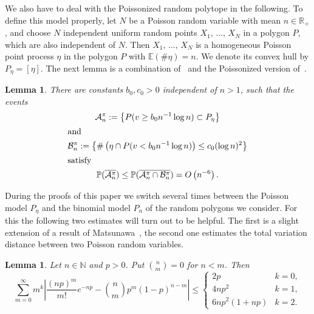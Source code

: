 \documentclass[10pt]{amsart}
\newtheorem{lemm}[theo]{Lemma}\newtheorem{prop}[theo]{Proposition}\newtheorem{coro}[theo]{Corollary}\newtheorem{conj}[theo]{Conjecture}
\theoremstyle{definition}\newtheorem{defi}[theo]{Definition}\newtheorem{rema}[theo]{Remark}\newtheorem{exam}[theo]{Example}\newtheorem{exem}[theo]{Example}\newtheorem{nota}[theo]{Notation}
\newcommand{\bbR}{\mathbb{R}}
\newcommand{\bbE}{\mathbb{E}}
\newcommand{\bbP}{\mathbb{P}}
\newcommand{\bbN}{\mathbb{N}}
\newcommand{\clA}{\mathcal{A}}
\newcommand{\clB}{\mathcal{B}}
\begin{document}
We also have to deal with the Poissonized random polytope in the following. To define this model properly, let $N$ be a Poisson random variable with mean $n\in \bbR_+$, and choose $N$ independent uniform random points $X_1,\,\dots,\,X_N$ in a polygon $P$, which are also independent of $N$. Then $X_1,\,\dots,\,X_N$ is a homogeneous Poisson point process $\eta$ in the polygon $P$ with $\bbE(\#\eta)=n$. We denote its convex hull by $P_\eta=[\eta]$. The next lemma is a combination of~\cite[Lemma~5.3]{BR10} and the Poissonized version of~\cite[Theorem~1]{BD}.

\begin{lemm}\label{le:floating-Peta}
There are constants $b_0, c_0>0$ independent of $n>1$, such that the events
\begin{gather*}
\clA^\pi_n := \left\{P(v\ge b_0 n^{-1} \log n)\subset P_\eta\right\}
\\
\intertext{and}
\clB^\pi_n := \left\{\#\left(\eta \cap P(v< b_0 n^{-1} \log n)\right)\leq c_0 (\log n)^2\right\}
\\
\intertext{satisfy}
\bbP(\overline{\clA^\pi_n}) \leq \bbP(\overline{\clA^\pi_n \cap \clB^\pi_n}) = O\left(n^{-6}\right).
\end{gather*}
\end{lemm}

During the proofs of this paper we switch several times between the Poisson model $P_\eta$ and the binomial model $P_n$ of the random polygons we consider. For this the following two estimates will turn out to be helpful. The first is a slight extension of a result of Matsunawa~\cite{Matsunawa}, the second one estimates the total variation distance between two Poisson random variables.

\begin{lemm}\label{le:diff-Poisson-binom}
Let $n \in \bbN$ and $p>0$. Put $\binom{n}{m}=0$ for $n<m$. Then
\begin{equation*}
\sum_{m=0}^\infty m^k \left|\frac{(np)^m}{m!} e^{-np} - \binom{n}{m} p^m (1-p)^{n-m} \right| \leq
\begin{cases}
2p & k=0, \\
4np^2 & k=1, \\
6np^2 (1+ n p) & k=2.
\end{cases}
\end{equation*}
\end{lemm}
\end{document}
